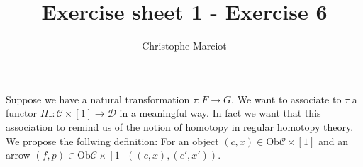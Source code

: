 \documentclass[11pt, a4paper, twoside]{article}
\begin{document}
\title{Exercise sheet 1 - Exercise 6}
\author{Christophe Marciot}
\maketitle

Suppose we have a natural transformation $\tau:F\rightarrow G$. We want to associate to $\tau$ a functor $H_\tau:\mathscr{C}\times[1]\rightarrow\mathscr{D}$ in a meaningful way. In fact we want that this association to remind us of the notion of homotopy in regular homotopy theory. \\
We propose the follwing definition: For an object $(c,x)\in \mathrm{Ob}\mathscr{C}\times[1]$ and an arrow $(f,p)\in \mathrm{Ob}\mathscr{C}\times[1]((c,x),(c',x'))$.
	\begin{displaymath}
	\end{displaymath}
		
\end{document}
